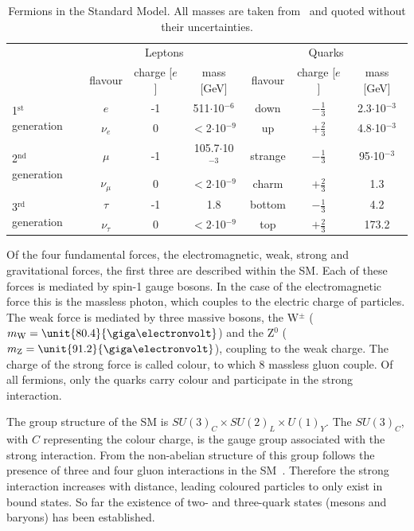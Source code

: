 \begin{table}
\centering
 \renewcommand{\arraystretch}{1.3}
\caption{Fermions in the Standard Model. All masses are taken from~\cite{PDG} and quoted without their uncertainties.}
\label{tab:fermions}
\begin{tabular}{l|c c c | c c c }
  & \multicolumn{3}{c|}{Leptons} & \multicolumn{3}{c}{Quarks} \\
    & flavour & charge [$e$] & mass [GeV] & flavour & charge [$e$] & mass [GeV] \\
    \hline
  \multirow{2}{*}{1$^{\mathrm{st}}$ generation} & $e$ & -1 & 511$\cdot$10$^{\mathrm{-6}}$ &  down & $-\frac{1}{3}$ & 2.3$\cdot$10$^{-3}$ \\
 												& $\nu_e$ & 0 & $<$2$\cdot$10$^{\mathrm{-9}}$ &  up & $+\frac{2}{3}$ & 4.8$\cdot$10$^{-3}$  \\
 												\hline
  \multirow{2}{*}{2$^{\mathrm{nd}}$ generation} & $\mu$ & -1  & 105.7$\cdot$10$^{\mathrm{-3}}$ & strange & $-\frac{1}{3}$ & 95$\cdot$10$^{-3}$ \\
 												& $\nu_{\mu}$ & 0 & $<$2$\cdot$10$^{\mathrm{-9}}$ & charm & $+\frac{2}{3}$ & 1.3 \\
 												\hline
  \multirow{2}{*}{3$^{\mathrm{rd}}$ generation} & $\tau$ & -1 & 1.8 & bottom & $-\frac{1}{3}$ & 4.2\\
 												& $\nu_{\tau}$ & 0 & $<$2$\cdot$10$^{\mathrm{-9}}$ & top & $+\frac{2}{3}$ & 173.2 \\ 												
 
 
\end{tabular}

\end{table}

Of the four fundamental forces, the electromagnetic, weak, strong and gravitational forces, the first three are described within the SM. Each of these forces is mediated by spin-1 gauge bosons. In the case of the electromagnetic force this is the massless photon, which couples to the electric charge of particles. The weak force is mediated by three massive bosons, the W$^{\pm}$ ($m_{\mathrm{W}} = \unit{80.4}{\giga\electronvolt}$) and the Z$^{0}$ ($m_{\mathrm{Z}} = \unit{91.2}{\giga\electronvolt}$), coupling to the weak charge. The charge of the strong force is called colour, to which 8 massless gluon couple. Of all fermions, only the quarks carry colour and participate in the strong interaction. 

The group structure of the SM is $SU(3)_C \times SU(2)_L \times U(1)_Y$. The $SU(3)_C$, with $C$ representing the colour charge, is the gauge group associated with the strong interaction. From the non-abelian structure of this group follows the presence of three and four gluon interactions in the SM~\cite{Pich:2007vu}. Therefore the strong interaction increases with distance, leading coloured particles to only exist in bound states. So far the existence of two- and three-quark states (mesons and baryons) has been established. 

